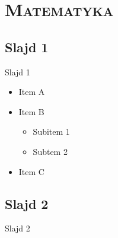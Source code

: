 \section{\scshape Matematyka}

\subsection{Slajd 1}
\begin{frame}{Slajd 1}
\begin{itemize}
\item Item A
\item Item B
\begin{itemize}
\item Subitem 1
\item Subtem 2
\end{itemize}
\item Item C
\end{itemize}
\end{frame}

\subsection{Slajd 2}
\begin{frame}{Slajd 2}

\end{frame}